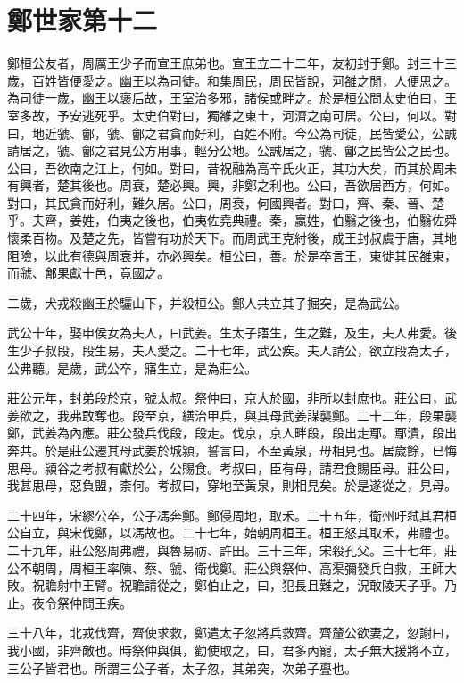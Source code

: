 \chapter{鄭世家第十二}

鄭桓公友者，周厲王少子而宣王庶弟也。宣王立二十二年，友初封于鄭。封三十三歲，百姓皆便愛之。幽王以為司徒。和集周民，周民皆說，河雒之閒，人便思之。為司徒一歲，幽王以褒后故，王室治多邪，諸侯或畔之。於是桓公問太史伯曰，王室多故，予安逃死乎。太史伯對曰，獨雒之東土，河濟之南可居。公曰，何以。對曰，地近虢、鄶，虢、鄶之君貪而好利，百姓不附。今公為司徒，民皆愛公，公誠請居之，虢、鄶之君見公方用事，輕分公地。公誠居之，虢、鄶之民皆公之民也。公曰，吾欲南之江上，何如。對曰，昔祝融為高辛氏火正，其功大矣，而其於周未有興者，楚其後也。周衰，楚必興。興，非鄭之利也。公曰，吾欲居西方，何如。對曰，其民貪而好利，難久居。公曰，周衰，何國興者。對曰，齊、秦、晉、楚乎。夫齊，姜姓，伯夷之後也，伯夷佐堯典禮。秦，嬴姓，伯翳之後也，伯翳佐舜懷柔百物。及楚之先，皆嘗有功於天下。而周武王克紂後，成王封叔虞于唐，其地阻險，以此有德與周衰并，亦必興矣。桓公曰，善。於是卒言王，東徙其民雒東，而虢、鄶果獻十邑，竟國之。

二歲，犬戎殺幽王於驪山下，并殺桓公。鄭人共立其子掘突，是為武公。

武公十年，娶申侯女為夫人，曰武姜。生太子寤生，生之難，及生，夫人弗愛。後生少子叔段，段生易，夫人愛之。二十七年，武公疾。夫人請公，欲立段為太子，公弗聽。是歲，武公卒，寤生立，是為莊公。

莊公元年，封弟段於京，號太叔。祭仲曰，京大於國，非所以封庶也。莊公曰，武姜欲之，我弗敢奪也。段至京，繕治甲兵，與其母武姜謀襲鄭。二十二年，段果襲鄭，武姜為內應。莊公發兵伐段，段走。伐京，京人畔段，段出走鄢。鄢潰，段出奔共。於是莊公遷其母武姜於城潁，誓言曰，不至黃泉，毋相見也。居歲餘，已悔思母。潁谷之考叔有獻於公，公賜食。考叔曰，臣有母，請君食賜臣母。莊公曰，我甚思母，惡負盟，柰何。考叔曰，穿地至黃泉，則相見矣。於是遂從之，見母。

二十四年，宋繆公卒，公子馮奔鄭。鄭侵周地，取禾。二十五年，衛州吁弒其君桓公自立，與宋伐鄭，以馮故也。二十七年，始朝周桓王。桓王怒其取禾，弗禮也。二十九年，莊公怒周弗禮，與魯易祊、許田。三十三年，宋殺孔父。三十七年，莊公不朝周，周桓王率陳、蔡、虢、衛伐鄭。莊公與祭仲、高渠彌發兵自救，王師大敗。祝聸射中王臂。祝聸請從之，鄭伯止之，曰，犯長且難之，況敢陵天子乎。乃止。夜令祭仲問王疾。

三十八年，北戎伐齊，齊使求救，鄭遣太子忽將兵救齊。齊釐公欲妻之，忽謝曰，我小國，非齊敵也。時祭仲與俱，勸使取之，曰，君多內寵，太子無大援將不立，三公子皆君也。所謂三公子者，太子忽，其弟突，次弟子亹也。

